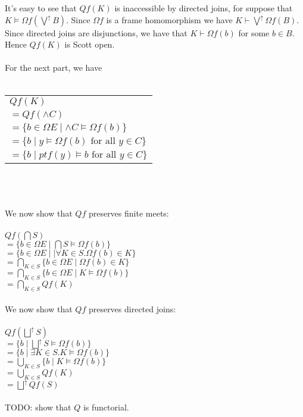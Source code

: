 \documentclass{article}
\begin{document}
It's easy to see that $Qf(K)$ is inaccessible by directed joins, for suppose that $K \vDash \Omega f(\bigvee^{\uparrow} B)$. Since $\Omega f$ 
is a frame homomorphism we have $K \vdash \bigvee^{\uparrow} \Omega f(B)$. Since directed joins are disjunctions, we have that 
$K \vdash \Omega f(b)$ for some $b \in B$. Hence $Qf(K)$ is Scott open.\\~\\
For the next part, we have \\~\\
\begin{tabular}{l}
$Qf(K)$  \\
$= Qf( \wedge C )$ \\
$= \{ b \in \Omega E \mid \wedge C \vDash \Omega f(b) \}$ \\
$= \{ b \mid y \vDash \Omega f(b) \text{ for all } y \in C \}$ \\
$= \{ b \mid \mathit{pt} f(y) \vDash b \text{ for all } y \in C \}$  
\end{tabular}\\~\\~\\
We now show that $Qf$ preserves finite meets:~\\~\\
$Qf( \bigcap S )$\\
$= \{ b \in \Omega E \mid \bigcap S \vDash \Omega f(b) \}$ \\
$= \{ b \in \Omega E \mid \mid \forall K \in S. \Omega f(b) \in K \}$\\
$= \bigcap_{K \in S} \{ b \in \Omega E \mid \Omega f(b) \in K \}$\\
$= \bigcap_{K \in S} \{ b \in \Omega E \mid K \vDash \Omega f(b) \}$\\
$= \bigcap_{K \in S} Qf(K)$\\~\\
We now show that $Qf$ preserves directed joins:~\\~\\
$Qf(\bigsqcup^{\uparrow} S)$\\
$= \{ b \mid \bigsqcup^{\uparrow} S \vDash \Omega f(b) \}$\\
$= \{ b \mid \exists K \in S. K \vDash \Omega f (b) \}$\\
$= \bigcup_{K \in S} \{ b \mid K \vDash \Omega f(b) \}$\\
$= \bigcup_{K \in S} Qf(K)$\\
$= \bigsqcup^{\uparrow} Qf(S)$\\~\\
TODO: show that $Q$ is functorial.
\end{document}
